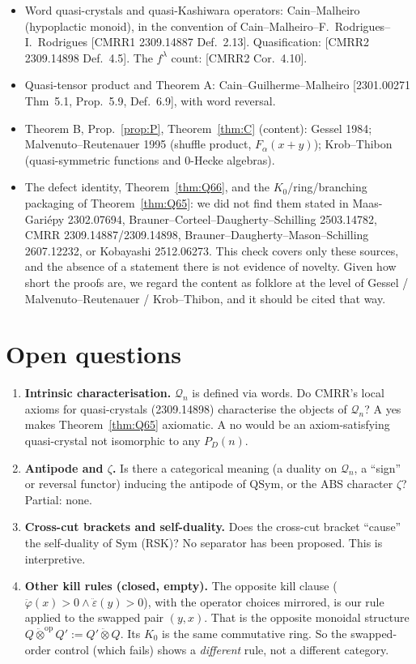 \documentclass[11pt]{amsart}
\theoremstyle{definition}
\theoremstyle{remark}
\newcommand{\eps}{\ddot\varepsilon}
\newcommand{\vphi}{\ddot\varphi}
\newcommand{\qt}{\mathbin{\ddot\otimes}}
\newcommand{\QSym}{\mathrm{QSym}}
\newcommand{\Sym}{\mathrm{Sym}}
\newcommand{\cQ}{\mathcal{Q}}
\begin{document}
\begin{itemize}[leftmargin=*]
\item Word quasi-crystals and quasi-Kashiwara operators: Cain--Malheiro (hypoplactic monoid), in the convention of Cain--Malheiro--F.~Rodrigues--I.~Rodrigues [CMRR1 2309.14887 Def.~2.13]. Quasification: [CMRR2 2309.14898 Def.~4.5]. The $f^\lambda$ count: [CMRR2 Cor.~4.10].
\item Quasi-tensor product and Theorem A: Cain--Guilherme--Malheiro [2301.00271 Thm~5.1, Prop.~5.9, Def.~6.9], with word reversal.
\item Theorem B, Prop.~\ref{prop:P}, Theorem~\ref{thm:C} (content): Gessel 1984; Malvenuto--Reutenauer 1995 (shuffle product, $F_\alpha(x+y)$); Krob--Thibon (quasi-symmetric functions and $0$-Hecke algebras).
\item The defect identity, Theorem~\ref{thm:Q66}, and the $K_0$/ring/branching packaging of Theorem~\ref{thm:Q65}: we did not find them stated in Maas-Gari\'epy 2302.07694, Brauner--Corteel--Daugherty--Schilling 2503.14782, CMRR 2309.14887/2309.14898, Brauner--Daugherty--Mason--Schilling 2607.12232, or Kobayashi 2512.06273. This check covers only these sources, and the absence of a statement there is not evidence of novelty. Given how short the proofs are, we regard the content as folklore at the level of Gessel / Malvenuto--Reutenauer / Krob--Thibon, and it should be cited that way.
\end{itemize}

\section{Open questions}
\begin{enumerate}[leftmargin=*]
\item \textbf{Intrinsic characterisation.} $\cQ_n$ is defined via words. Do CMRR's local axioms for quasi-crystals (2309.14898) characterise the objects of $\cQ_n$? A yes makes Theorem~\ref{thm:Q65} axiomatic. A no would be an axiom-satisfying quasi-crystal not isomorphic to any $P_D(n)$.
\item \textbf{Antipode and $\zeta$.} Is there a categorical meaning (a duality on $\cQ_n$, a ``sign'' or reversal functor) inducing the antipode of $\QSym$, or the ABS character $\zeta$? Partial: none.
\item \textbf{Cross-cut brackets and self-duality.} Does the cross-cut bracket ``cause'' the self-duality of $\Sym$ (RSK)? No separator has been proposed. This is interpretive.
\item \textbf{Other kill rules (closed, empty).} The opposite kill clause ($\vphi(x)>0\wedge\eps(y)>0$), with the operator choices mirrored, is our rule applied to the swapped pair $(y,x)$. That is the opposite monoidal structure $Q\qt^{\mathrm{op}}Q':=Q'\qt Q$. Its $K_0$ is the same commutative ring. So the swapped-order control (which fails) shows a \emph{different} rule, not a different category.
\end{enumerate}
\end{document}

